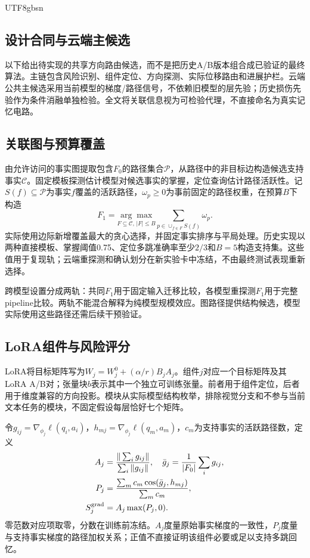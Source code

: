 \documentclass[sigconf,anonymous,review]{acmart}
\begin{document}
\begin{CJK*}{UTF8}{gbsn}
\subsection{设计合同与云端主候选}
以下给出待实现的共享方向路由候选，而不是把历史A/B版本组合成已验证的最终算法。主链包含风险识别、组件定位、方向探测、实际位移路由和进展护栏。云端公共主候选采用当前模型的梯度/路径信号，不依赖旧模型的层先验；历史损伤先验作为条件消融单独检验。全文将关联信息视为可检验代理，不直接命名为真实记忆电路。

\subsection{关联图与预算覆盖}
由允许访问的事实图提取包含$F_0$的路径集合$\mathcal P$，从路径中的非目标边构造候选支持事实$\mathcal C$。固定模板探测估计模型对候选事实的掌握，定位查询估计路径活跃性。记$S(f)\subseteq\mathcal P$为事实$f$覆盖的活跃路径，$\omega_p\geq0$为事前固定的路径权重，在预算$B$下构造
\begin{equation}
 F_1=\underset{F\subseteq\mathcal C,\,|F|\leq B}{\arg\max}
 \sum_{p\in\cup_{f\in F}S(f)}\omega_p.
 \label{eq:coverage}
\end{equation}
实际使用边际新增覆盖最大的贪心选择，并固定事实排序与平局处理。历史实现以两种直接模板、掌握阈值0.75、定位多跳准确率至少$2/3$和$B=5$构造支持集。这些值用于复现轨；云端重探测和确认划分在新实验卡中冻结，不由最终测试表现重新选择。

跨模型设置分成两轨：共同$F_1$用于固定输入迁移比较，各模型重探测$F_1$用于完整pipeline比较。两轨不能混合解释为纯模型规模效应。图路径提供结构候选，模型实际使用这些路径还需后续干预验证。

\subsection{LoRA组件与风险评分}
LoRA将目标矩阵写为$W_j=W_j^0+(\alpha/r)B_jA_j$\cite{lora}。组件$j$对应一个目标矩阵及其LoRA A/B对；张量块$b$表示其中一个独立可训练张量。前者用于组件定位，后者用于维度兼容的方向投影。模块从实际模型结构枚举，排除视觉分支和不参与当前文本任务的模块，不固定假设每层恰好七个矩阵。

令$g_{ij}=\nabla_{\phi_j}\ell(q_i,a_i)$，$h_{mj}=\nabla_{\phi_j}\ell(q_m,a_m)$，$c_m$为支持事实的活跃路径数，定义
\begin{align}
 A_j&=\frac{\|\sum_i g_{ij}\|}{\sum_i\|g_{ij}\|},\quad
 \bar g_j=\frac{1}{|F_0|}\sum_i g_{ij},\\
 P_j&=\frac{\sum_m c_m\cos(\bar g_j,h_{mj})}{\sum_m c_m},\\
 S_j^{\rm grad}&=A_j\max(P_j,0).
 \label{eq:score}
\end{align}
零范数对应项取零，分数在训练前冻结。$A_j$度量原始事实梯度的一致性，$P_j$度量与支持事实梯度的路径加权关系；正值不直接证明该组件必要或足以支持多跳回忆。


\end{CJK*}
\end{document}
